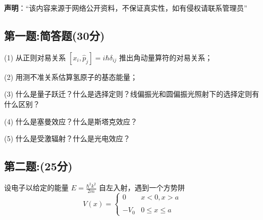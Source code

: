 
\textbf{声明}：“该内容来源于网络公开资料，不保证真实性，如有侵权请联系管理员”

\subsection{第一题:简答题(30分)}
(1) 从正则对易关系 $[x_i, \hat{p}_j] = i\hbar \delta_{ij}$ 推出角动量算符的对易关系；

(2) 用测不准关系估算氢原子的基态能量；

(3) 什么是量子跃迁？什么是选择定则？线偏振光和圆偏振光照射下的选择定则有什么区别？

(4) 什么是塞曼效应？什么是斯塔克效应？

(5) 什么是受激辐射？什么是光电效应？

\subsection{第二题:(25分)}
设电子以给定的能量 $E = \frac{\hbar^2 k^2}{2m}$ 自左入射，遇到一个方势阱
\[V(x) = \begin{cases} 0 & x < 0, x > a \\\\- V_0 & 0 \leq x \leq a\end{cases}~\]